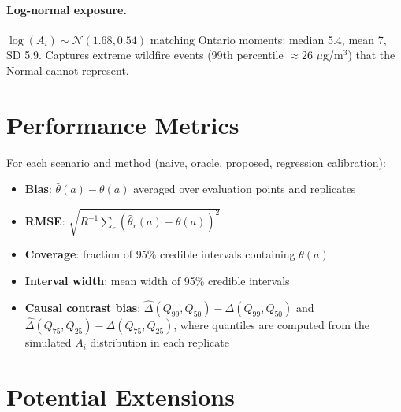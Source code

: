 \documentclass[11pt]{article}
\begin{document}
\paragraph{Log-normal exposure.}
$\log(A_i) \sim \mathcal{N}(1.68, 0.54)$ matching Ontario moments: median 5.4, mean 7,
SD 5.9. Captures extreme wildfire events (99th percentile $\approx 26$ $\mu$g/m$^3$)
that the Normal cannot represent.

\section{Performance Metrics}

For each scenario and method (naive, oracle, proposed, regression calibration):

\begin{itemize}
\item \textbf{Bias}: $\hat{\theta}(a) - \theta(a)$ averaged over evaluation points and
replicates
\item \textbf{RMSE}: $\sqrt{R^{-1}\sum_r (\hat{\theta}_r(a) - \theta(a))^2}$
\item \textbf{Coverage}: fraction of 95\% credible intervals containing $\theta(a)$
\item \textbf{Interval width}: mean width of 95\% credible intervals
\item \textbf{Causal contrast bias}: $\hat{\Delta}(Q_{99}, Q_{50}) - \Delta(Q_{99},
Q_{50})$ and $\hat{\Delta}(Q_{75}, Q_{25}) - \Delta(Q_{75}, Q_{25})$, where quantiles
are computed from the simulated $A_i$ distribution in each replicate
\end{itemize}

\section{Potential Extensions}
\label{sec:extensions}
\end{document}
